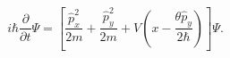 \begin{equation}
i\hbar\frac{\partial}{\partial t}\Psi=\left[  \frac{\hat{p}_{x}^{2}}{2m}%
+\frac{\hat{p}_{y}^{2}}{2m}+V\left(  x-\frac{\theta\hat{p}_{y}}{2\hbar
}\right)  \right]  \Psi.\label{59}%
\end{equation}

